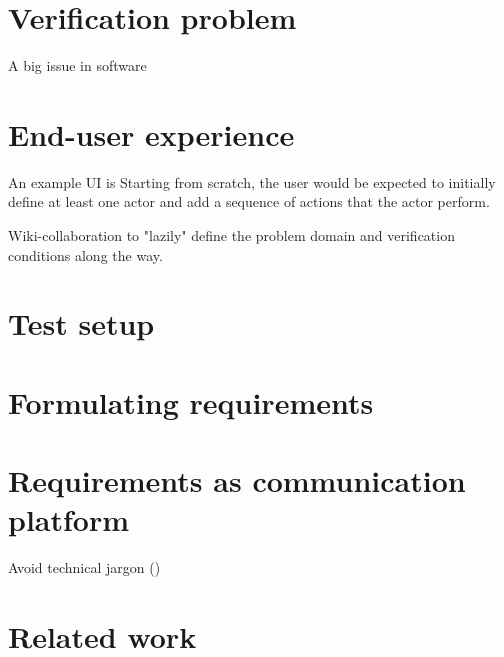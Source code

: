 \documentclass[10pt]{scrreprt}
\begin{document}
\section{Verification problem}
A big issue in software

\section{End-user experience}


An example UI is Starting from scratch, the user would be expected to initially define at least one actor and add a sequence of actions that the actor perform.

Wiki-collaboration to "lazily" define the problem domain and verification conditions along the way.

\section{Test setup}

\section{Formulating requirements}

\section{Requirements as communication platform}

Avoid technical jargon (\cite{christel1992issues})

\section{Related work}
\end{document}
